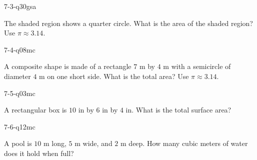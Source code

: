 \begin{practiceQuestion}{7-3-q30}{gsa}
\begin{questionText}
The shaded region shows a quarter circle. What is the area of the shaded region? Use $\pi \approx 3.14$.

\begin{center}
\end{center}
\end{questionText}
\end{practiceQuestion}

\begin{practiceQuestion}{7-4-q08}{mc}
\begin{questionText}
A composite shape is made of a rectangle $7$ m by $4$ m with a semicircle of diameter $4$ m on one short side. What is the total area? Use $\pi \approx 3.14$.
\end{questionText}
\end{practiceQuestion}

\begin{practiceQuestion}{7-5-q03}{mc}
\begin{questionText}
A rectangular box is $10$ in by $6$ in by $4$ in. What is the total surface area?
\end{questionText}
\end{practiceQuestion}

\begin{practiceQuestion}{7-6-q12}{mc}
\begin{questionText}
A pool is $10$ m long, $5$ m wide, and $2$ m deep. How many cubic meters of water does it hold when full?
\end{questionText}
\end{practiceQuestion}

